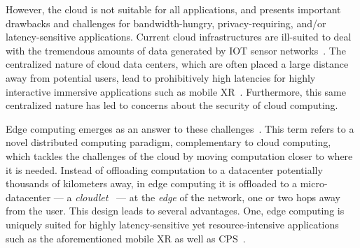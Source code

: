 However, the cloud is not suitable for all applications, and presents important drawbacks and challenges for bandwidth-hungry, privacy-requiring, and/or latency-sensitive applications.
Current cloud infrastructures are ill-suited to deal with the tremendous amounts of data generated by \gls{IOT} sensor networks~\cite{shi2016edge}.
The centralized nature of cloud data centers, which are often placed a large distance away from potential users, lead to prohibitively high latencies for highly interactive immersive applications such as mobile \gls{XR}~\cite{satyanarayanan2009case,varghese2016challenges,shi2016promise}.
Furthermore, this same centralized nature has led to concerns about the security of cloud computing.

Edge computing emerges as an answer to these challenges~\cite{satyanarayanan2009case,shi2016promise,shi2016edge,varghese2016challenges,satyanarayanan2017emergence}.
This term refers to a novel distributed computing paradigm, complementary to cloud computing, which tackles the challenges of the cloud by moving computation closer to where it is needed.
Instead of offloading computation to a datacenter potentially thousands of kilometers away, in edge computing it is offloaded to a micro-datacenter --- a \emph{cloudlet}~\cite{satyanarayanan2009case} --- at the \emph{edge} of the network, one or two hops away from the user.
This design leads to several advantages.
One, edge computing is uniquely suited for highly latency-sensitive yet resource-intensive applications such as the aforementioned mobile \gls{XR} as well as \gls{CPS}~\cite{sasaki2016vehicle,wang2018bandwidth,wan2020efficient}.



